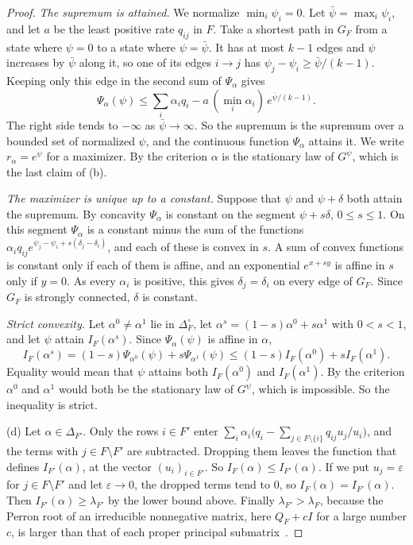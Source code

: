 \begin{proof}
\emph{The supremum is attained.} We normalize $\min_i\psi_i=0$. Let
$\bar\psi=\max_i\psi_i$, and let $a$ be the least positive rate $q_{ij}$ in
$F$. Take a shortest path in $G_F$ from a state where $\psi=0$ to a state
where $\psi=\bar\psi$. It has at most $k-1$ edges and $\psi$ increases by
$\bar\psi$ along it, so one of its edges $i\to j$ has
$\psi_j-\psi_i\ge\bar\psi/(k-1)$. Keeping only this edge in the second sum of
$\Psi_\alpha$ gives
\[
\Psi_\alpha(\psi)\le\sum_i\alpha_iq_i-a\,(\min_i\alpha_i)\,e^{\bar\psi/(k-1)} .
\]
The right side tends to $-\infty$ as $\bar\psi\to\infty$. So the supremum is
the supremum over a bounded set of normalized $\psi$, and the continuous
function $\Psi_\alpha$ attains it. We write $r_\alpha=e^\psi$ for a maximizer.
By the criterion $\alpha$ is the stationary law of $G^\psi$, which is the last
claim of (b).

\emph{The maximizer is unique up to a constant.} Suppose that $\psi$ and
$\psi+\delta$ both attain the supremum. By concavity $\Psi_\alpha$ is constant
on the segment $\psi+s\delta$, $0\le s\le1$. On this segment $\Psi_\alpha$ is
a constant minus the sum of the functions
$\alpha_iq_{ij}e^{\psi_j-\psi_i+s(\delta_j-\delta_i)}$, and each of these is
convex in $s$. A sum of convex functions is constant only if each of them is
affine, and an exponential $e^{x+sy}$ is affine in $s$ only if $y=0$. As every
$\alpha_i$ is positive, this gives $\delta_j=\delta_i$ on every edge of $G_F$.
Since $G_F$ is strongly connected, $\delta$ is constant.

\emph{Strict convexity.} Let $\alpha^0\ne\alpha^1$ lie in $\Delta_F^\circ$, let
$\alpha^s=(1-s)\alpha^0+s\alpha^1$ with $0<s<1$, and let $\psi$ attain
$I_F(\alpha^s)$. Since $\Psi_\alpha(\psi)$ is affine in $\alpha$,
\[
I_F(\alpha^s)=(1-s)\Psi_{\alpha^0}(\psi)+s\Psi_{\alpha^1}(\psi)
\le(1-s)I_F(\alpha^0)+sI_F(\alpha^1).
\]
Equality would mean that $\psi$ attains both $I_F(\alpha^0)$ and
$I_F(\alpha^1)$. By the criterion $\alpha^0$ and $\alpha^1$ would both be the
stationary law of $G^\psi$, which is impossible. So the inequality is strict.

(d) Let $\alpha\in\Delta_{F'}$. Only the rows $i\in F'$ enter
$\sum_i\alpha_i\bigl(q_i-\sum_{j\in F\setminus\{i\}}q_{ij}u_j/u_i\bigr)$, and
the terms with $j\in F\setminus F'$ are subtracted. Dropping them leaves the
function that defines $I_{F'}(\alpha)$, at the vector $(u_i)_{i\in F'}$. So
$I_F(\alpha)\le I_{F'}(\alpha)$. If we put $u_j=\varepsilon$ for
$j\in F\setminus F'$ and let $\varepsilon\to0$, the dropped terms tend to $0$,
so $I_F(\alpha)=I_{F'}(\alpha)$. Then $I_{F'}(\alpha)\ge\lambda_{F'}$ by the
lower bound above. Finally $\lambda_{F'}>\lambda_F$, because the Perron root
of an irreducible nonnegative matrix, here $Q_F+cI$ for a large number $c$, is
larger than that of each proper principal
submatrix~\cite[Ch.~2]{bermanplemmons1994}.


\end{proof}
